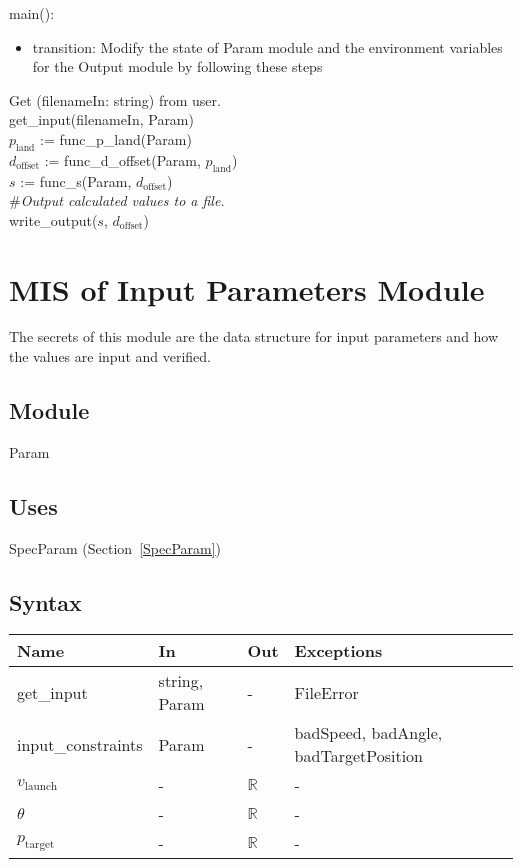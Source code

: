 \documentclass[12pt, titlepage]{article}
\begin{document}
\noindent main():
\begin{itemize}
\item transition: Modify the state of Param module and the environment variables
  for the Output module by following these steps\\
\end{itemize}

\noindent Get (filenameIn: string) from user.\\
\noindent get\_input(filenameIn, Param)\\
\noindent $p_{\text{land}}$ := func\_p\_land(Param)\\
\noindent $d_{\text{offset}}$ := func\_d\_offset(Param, $p_{\text{land}}$)\\
\noindent $s$ := func\_s(Param, $d_{\text{offset}}$)\\
\noindent \#\textit{Output calculated values to a file.}\\
\noindent write\_output($s$, $d_{\text{offset}}$)\\

\newpage

\section{MIS of Input Parameters Module} \label{Parameters}

The secrets of this module are the data structure for input parameters and how 
the values are input and verified.

\subsection{Module}

Param

\subsection{Uses}

SpecParam (Section~\ref{SpecParam})

\subsection{Syntax}

\begin{tabular}{p{3cm} p{2.5cm} p{1cm} >{\raggedright\arraybackslash}p{7.5cm}}
\toprule
\textbf{Name} & \textbf{In} & \textbf{Out} & \textbf{Exceptions} \\
\midrule
get\_input & string, Param & - &  FileError \\
input\_constraints & Param & - & badSpeed, badAngle, badTargetPosition\\
$v_{\text{launch}}$ & - & $\mathbb{R}$ & -\\
$\theta$ & - & $\mathbb{R}$ & -\\
$p_{\text{target}}$ & - & $\mathbb{R}$ & -\\
\bottomrule
\end{tabular}
\end{document}
